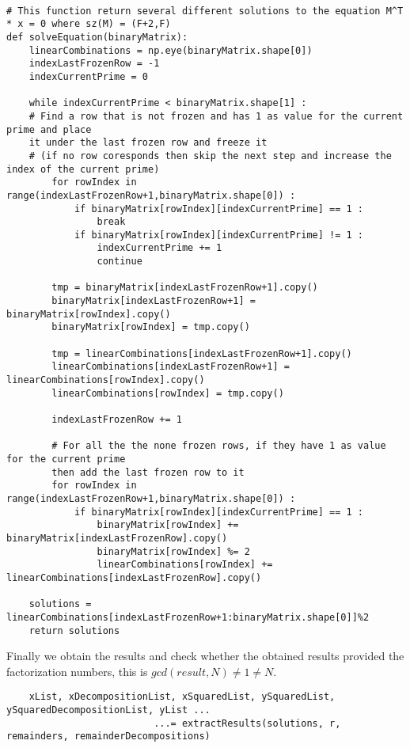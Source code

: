 \documentclass{article}
\begin{document}
\begin{verbatim}

# This function return several different solutions to the equation M^T * x = 0 where sz(M) = (F+2,F)
def solveEquation(binaryMatrix):
    linearCombinations = np.eye(binaryMatrix.shape[0])
    indexLastFrozenRow = -1
    indexCurrentPrime = 0
    
    while indexCurrentPrime < binaryMatrix.shape[1] :
    # Find a row that is not frozen and has 1 as value for the current prime and place 
    it under the last frozen row and freeze it
    # (if no row coresponds then skip the next step and increase the index of the current prime)
        for rowIndex in range(indexLastFrozenRow+1,binaryMatrix.shape[0]) :
            if binaryMatrix[rowIndex][indexCurrentPrime] == 1 :
                break
            if binaryMatrix[rowIndex][indexCurrentPrime] != 1 :
                indexCurrentPrime += 1
                continue
    
        tmp = binaryMatrix[indexLastFrozenRow+1].copy()
        binaryMatrix[indexLastFrozenRow+1] = binaryMatrix[rowIndex].copy()
        binaryMatrix[rowIndex] = tmp.copy()
    
        tmp = linearCombinations[indexLastFrozenRow+1].copy()
        linearCombinations[indexLastFrozenRow+1] = linearCombinations[rowIndex].copy()
        linearCombinations[rowIndex] = tmp.copy()
    
        indexLastFrozenRow += 1
    
        # For all the the none frozen rows, if they have 1 as value for the current prime 
        then add the last frozen row to it
        for rowIndex in range(indexLastFrozenRow+1,binaryMatrix.shape[0]) :
            if binaryMatrix[rowIndex][indexCurrentPrime] == 1 :
                binaryMatrix[rowIndex] += binaryMatrix[indexLastFrozenRow].copy()
                binaryMatrix[rowIndex] %= 2
                linearCombinations[rowIndex] += linearCombinations[indexLastFrozenRow].copy()
    
    solutions = linearCombinations[indexLastFrozenRow+1:binaryMatrix.shape[0]]%2
    return solutions
\end{verbatim}

Finally we obtain the results and check whether the obtained results provided the factorization numbers, this is $gcd(result,N) \neq 1 \neq N$.


\begin{verbatim}
    xList, xDecompositionList, xSquaredList, ySquaredList, ySquaredDecompositionList, yList ...
                          ...= extractResults(solutions, r, remainders, remainderDecompositions)
\end{verbatim}
\end{document}
